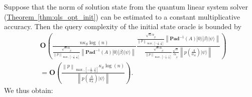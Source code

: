 \documentclass[letterpaper,onecolumn,11pt,accepted=2026-02-14]{quantumarticle}
\newcommand{\norm}[1]{\left\lVert#1\right\rVert}
\theoremstyle{remark}
\theoremstyle{plain}
\newcommand{\thm}[1]{\hyperref[thm:#1]{Theorem~\ref*{thm:#1}}}
\newcommand{\ket}[1]{|#1\rangle}
\begin{document}
Suppose that the norm of solution state from the quantum linear system solver (\thm{qls_opt_init}) can be estimated to a constant multiplicative accuracy. Then the query complexity of the initial state oracle is bounded by
\begin{equation}
\begin{aligned}
    &\mathbf{O}\left(\frac{n\kappa_S\log(n)}{\frac{\sqrt{n}\alpha_{\widetilde{\beta}}}{\norm{p}_{\max,\left[-\frac{1}{2},\frac{1}{2}\right]}}
    \norm{\mathbf{Pad}^{-1}(A)\ket{0}\ket{\beta}\ket{\psi}}}
    \frac{\frac{\sqrt{n}\alpha_{\widetilde{\beta}}}{\norm{p}_{\max,\left[-\frac{1}{2},\frac{1}{2}\right]}}
    \norm{\mathbf{Pad}^{-1}(A)\ket{0}\ket{\beta}\ket{\psi}}}{\frac{\sqrt{n}\alpha_{\widetilde{\beta}}}{\norm{p}_{\max,\left[-\frac{1}{2},\frac{1}{2}\right]}}\frac{\sqrt{n}}{\alpha_{\widetilde{\beta}}}\norm{p\left(\frac{A}{\alpha_A}\right)\ket{\psi}}}\right)\\
    &=\mathbf{O}\left(\frac{\norm{p}_{\max,\left[-\frac{1}{2},\frac{1}{2}\right]}\kappa_S\log(n)}{\norm{p\left(\frac{A}{\alpha_A}\right)\ket{\psi}}}\right).
\end{aligned}
\end{equation}
We thus obtain:
\end{document}
